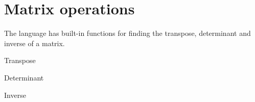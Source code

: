 \documentclass[a4paper, oneside, 11pt]{report}
\begin{document}
\section{Matrix operations}\label{sec:matrix-ops}
    
The language has built-in functions for finding the transpose, determinant and inverse of a matrix.
    
\begin{algorithm}
    \caption{Transpose}
    \begin{algorithmic}
    \end{algorithmic}\label{alg:algorithm8}
\end{algorithm}
    
\begin{algorithm}
    \caption{Determinant}
    \begin{algorithmic}
    \end{algorithmic}\label{alg:algorithm9}
\end{algorithm}
    
\begin{algorithm}
    \caption{Inverse}
    \begin{algorithmic}
    \end{algorithmic}\label{alg:algorithm10}
\end{algorithm}
    
\end{document}
